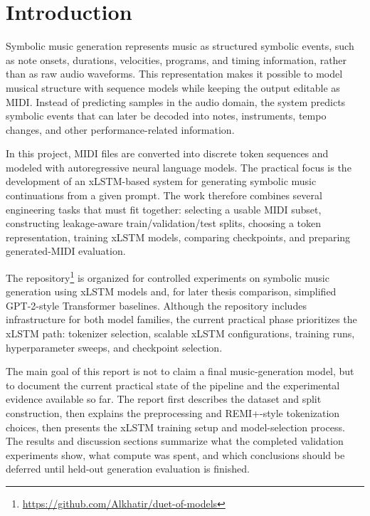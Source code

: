 \section{Introduction}

Symbolic music generation represents music as structured symbolic events, such
as note onsets, durations, velocities, programs, and timing information, rather
than as raw audio waveforms. This representation makes it possible to model
musical structure with sequence models while keeping the output editable as MIDI.
Instead of predicting samples in the audio domain, the system predicts symbolic
events that can later be decoded into notes, instruments, tempo changes, and
other performance-related information.

In this project, MIDI files are converted into discrete token sequences and
modeled with autoregressive neural language models. The practical focus is the
development of an xLSTM-based system for generating symbolic music continuations
from a given prompt. The work therefore combines several engineering tasks that
must fit together: selecting a usable MIDI subset, constructing leakage-aware
train/validation/test splits, choosing a token representation, training xLSTM
models, comparing checkpoints, and preparing generated-MIDI evaluation.

The repository\footnote{\url{https://github.com/Alkhatir/duet-of-models}} is
organized for controlled experiments on symbolic music generation using xLSTM
models and, for later thesis comparison, simplified GPT-2-style Transformer
baselines. Although the repository includes infrastructure for both model
families, the current practical phase prioritizes the xLSTM path: tokenizer
selection, scalable xLSTM configurations, training runs, hyperparameter sweeps,
and checkpoint selection.

The main goal of this report is not to claim a final music-generation model, but
to document the current practical state of the pipeline and the experimental
evidence available so far. The report first describes the dataset and split
construction, then explains the preprocessing and REMI+-style tokenization
choices, then presents the xLSTM training setup and model-selection process.
The results and discussion sections summarize what the completed validation
experiments show, what compute was spent, and which conclusions should be
deferred until held-out generation evaluation is finished.
